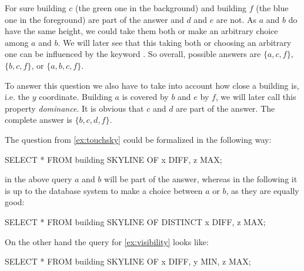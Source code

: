 \begin{example}\label{ex:touchsky}
For sure building $c$ (the green one in the background) and building $f$
(the blue one in the foreground) are part of the answer and $d$ and $e$
are not.  As $a$ and $b$ do have the same height, we could take them
both or make an arbitrary choice among $a$ and $b$.  We will later
see that this taking both or choosing an arbitrary one can be
influenced by the keyword . So overall, possible
answers are $\{a, c, f\}$, $\{b, c, f\}$, or $\{a, b, c, f\}$.
\end{example}

\begin{example}\label{ex:visibility}
To answer this question we also have to take into account how close a
building is, i.e. the $y$ coordinate.  Building $a$ is covered by $b$
and $e$ by $f$, we will later call this property \emph{dominance}. It
is obvious that $c$ and $d$ are part of the answer. The complete
answer is $\{b, c, d, f\}$.
\end{example}

\noindent
The question from \autoref{ex:touchsky} could be formalized in the
following way:

\begin{interactive}
SELECT * FROM building SKYLINE OF x DIFF, z MAX;
\end{interactive}

\noindent
in the above query $a$ and $b$ will be part of the answer, whereas in the following
it is up to the database system to make a choice between $a$ or $b$, as they 
are equally good:

\begin{interactive}
SELECT * FROM building SKYLINE OF DISTINCT x DIFF, z MAX;
\end{interactive}

\noindent
On the other hand the query for \autoref{ex:visibility} looks like:

\begin{interactive}
SELECT * FROM building SKYLINE OF x DIFF, y MIN, z MAX;
\end{interactive}

